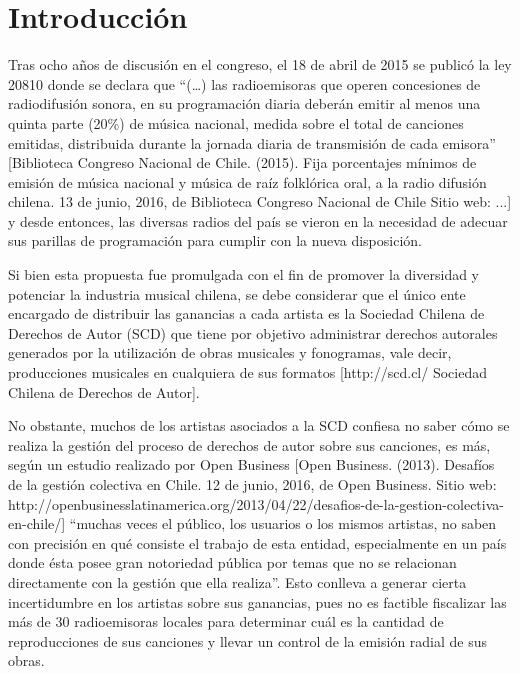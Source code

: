 
\chapter*{Introducción}



Tras ocho años de discusión en el congreso, el 18 de abril de 2015 se publicó la ley 20810 donde se declara que “(…) las radioemisoras que operen concesiones de radiodifusión sonora, en su programación diaria deberán emitir al menos una quinta parte (20\%) de música nacional, medida sobre el total de canciones emitidas, distribuida durante la jornada diaria de transmisión de cada emisora” [Biblioteca Congreso Nacional de Chile. (2015). Fija porcentajes mínimos de emisión de música nacional y música de raíz folklórica oral, a la radio difusión chilena. 13 de junio, 2016, de Biblioteca Congreso Nacional de Chile Sitio web: ...] y desde entonces, las diversas radios del país se vieron en la necesidad de adecuar sus parillas de programación para cumplir con la nueva disposición.

\bigskip

Si bien esta propuesta fue promulgada con el fin de promover la diversidad y potenciar la industria musical chilena, se debe considerar que el único ente encargado de distribuir las ganancias a cada artista es la Sociedad Chilena de Derechos de Autor (SCD) que tiene por objetivo administrar derechos autorales generados por la utilización de obras musicales y fonogramas, vale decir, producciones musicales en cualquiera de sus formatos [http://scd.cl/ Sociedad Chilena de Derechos de Autor].

\bigskip

No obstante, muchos de los artistas asociados a la SCD confiesa no saber cómo se realiza la gestión del proceso de derechos de autor sobre sus canciones, es más, según un estudio realizado por Open Business [Open Business. (2013). Desafíos de la gestión colectiva en Chile. 12 de junio, 2016, de Open Business. Sitio web: http://openbusinesslatinamerica.org/2013/04/22/desafios-de-la-gestion-colectiva-en-chile/] “muchas veces el público, los usuarios o los mismos artistas, no saben con precisión en qué consiste el trabajo de esta entidad, especialmente en un país donde ésta posee gran notoriedad pública por temas que no se relacionan directamente con la gestión que ella realiza”. Esto conlleva a generar cierta incertidumbre en los artistas sobre sus ganancias, pues no es factible fiscalizar las más de 30 radioemisoras locales para determinar cuál es la cantidad de reproducciones de sus canciones y llevar un control de la emisión radial de sus obras.

